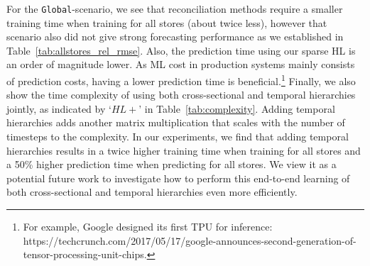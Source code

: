 \documentclass[preprint, 3p, times, twocolumn]{elsarticle}
\begin{document}
  For the \texttt{Global}-scenario, we see that reconciliation methods require a smaller training time when training for all stores (about twice less), however that scenario also did not give strong forecasting performance as we established in Table~\ref{tab:allstores_rel_rmse}. Also, the prediction time using our sparse HL is an order of magnitude lower. As ML cost in production systems mainly consists of prediction costs, having a lower prediction time is beneficial.\footnote{For example, Google designed its first TPU for inference: https://techcrunch.com/2017/05/17/google-announces-second-generation-of-tensor-processing-unit-chips.}
  Finally, we also show the time complexity of using both cross-sectional and temporal hierarchies jointly, as indicated by `\(HL+\)' in Table~\ref{tab:complexity}. Adding temporal hierarchies adds another matrix multiplication that scales with the number of timesteps to the complexity. In our experiments, we find that adding temporal hierarchies results in a twice higher training time when training for all stores and a 50\% higher prediction time when predicting for all stores. We view it as a potential future work to investigate how to perform this end-to-end learning of both cross-sectional and temporal hierarchies even more efficiently.
  
\end{document}

